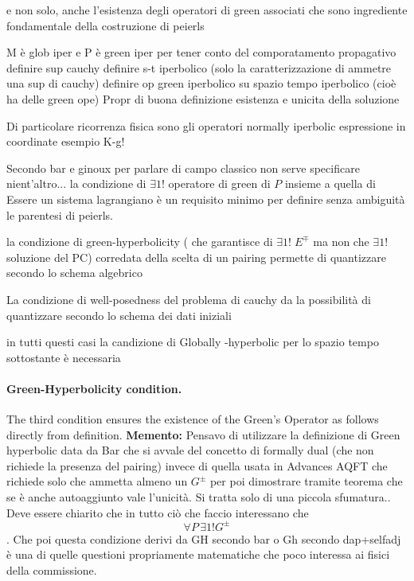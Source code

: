 \documentclass[Main]{subfiles}
\begin{document}
		e non solo, anche l'esistenza degli operatori di green associati che sono ingrediente fondamentale della costruzione di peierls

		M è glob iper e P è green iper per tener conto del comporatamento propagativo
		definire sup cauchy
		definire s-t iperbolico (solo la caratterizzazione di ammetre una sup di cauchy)
		definire op green iperbolico su spazio tempo iperbolico (cioè ha delle green ope)
		Propr di buona definizione esistenza e unicita della soluzione
		
		Di particolare ricorrenza fisica sono gli operatori normally iperbolic
		espressione in coordinate
		esempio K-g!
		\danger

		
		\danger
		
		Secondo bar e ginoux per parlare di campo classico non serve specificare nient'altro...
		la condizione di $\exists  1!$ operatore di green di $P$  insieme a quella di Essere un sistema lagrangiano è un requisito minimo  per definire senza ambiguità le parentesi di peierls.
		
		la condizione di green-hyperbolicity ( che garantisce di $\exists 1!\; E^\mp$ ma non che  $\exists 1!$ soluzione del PC) corredata della scelta di un pairing permette di quantizzare secondo lo schema algebrico
		
		La condizione di well-posedness del problema di cauchy da la possibilità di quantizzare secondo lo schema dei dati iniziali
		
		in tutti questi casi la candizione di Globally -hyperbolic per lo spazio tempo sottostante è necessaria
		\danger


		\paragraph{Green-Hyperbolicity condition.}
			The third condition  ensures the existence of the Green's Operator as follows directly from definition.
			\danger \textbf{Memento:}
				Pensavo di utilizzare la definizione di Green hyperbolic data da Bar che si avvale del concetto di formally dual (che non richiede la presenza del pairing) invece di quella usata in Advances AQFT che richiede solo che ammetta almeno un $G^\pm$  per poi dimostrare tramite teorema che se è anche autoaggiunto vale l'unicità. Si tratta solo di una piccola sfumatura.. Deve essere chiarito che in tutto ciò che faccio interessano che $$\forall P \, \exists1!G^\pm$$.
				Che poi questa condizione derivi da GH secondo bar o Gh secondo dap+selfadj è una di quelle questioni propriamente matematiche che poco interessa ai fisici della commissione.
			
\end{document}
